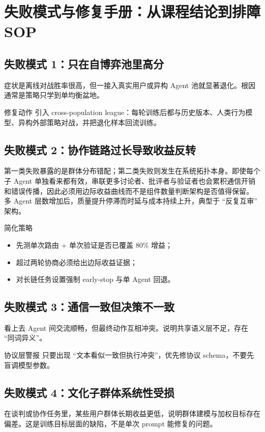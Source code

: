 \section{失败模式与修复手册：从课程结论到排障 SOP}

\subsection{失败模式 1：只在自博弈池里高分}
症状是离线对战胜率很高，但一接入真实用户或异构 Agent 池就显著退化。根因通常是策略只学到单均衡盆地。

\begin{importantbox}{修复动作}
引入 cross-population league：每轮训练后都与历史版本、人类行为模型、异构外部策略对战，并把退化样本回流训练。
\end{importantbox}

\subsection{失败模式 2：协作链路过长导致收益反转}
第一类失败暴露的是群体分布错配；第二类失败则发生在系统拓扑本身。即使每个子 Agent 单独看来都有效，串联更多讨论者、批评者与验证者也会累积通信开销和错误传播，因此必须用边际收益曲线而不是组件数量判断架构是否值得保留。
多 Agent 层数增加后，质量提升停滞而时延与成本持续上升，典型于 ``反复互审'' 架构。

\begin{knowledgebox}{简化策略}
\begin{itemize}
    \item 先测单次路由 + 单次验证是否已覆盖 80\% 增益；
    \item 超过两轮协商必须给出边际收益证据；
    \item 对长链任务设置强制 early-stop 与单 Agent 回退。
\end{itemize}
\end{knowledgebox}

\subsection{失败模式 3：通信一致但决策不一致}
看上去 Agent 间交流顺畅，但最终动作互相冲突。说明共享语义层不足，存在 ``同词异义''。

\begin{warningbox}{协议层警报}
只要出现 ``文本看似一致但执行冲突''，优先修协议 schema，不要先盲调模型参数。
\end{warningbox}

\subsection{失败模式 4：文化子群体系统性受损}
在谈判或协作任务里，某些用户群体长期收益更低，说明群体建模与加权目标存在偏差。这是训练目标层面的缺陷，不是单次 prompt 能修复的问题。

